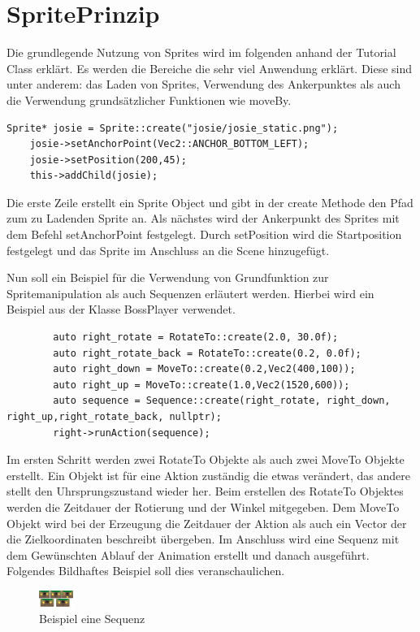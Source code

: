 \section{SpritePrinzip}
Die grundlegende Nutzung von Sprites wird im folgenden anhand der Tutorial Class erklärt. Es werden die Bereiche die sehr viel Anwendung erklärt. Diese sind unter anderem: das Laden von Sprites, Verwendung des Ankerpunktes als auch die Verwendung grundsätzlicher Funktionen wie moveBy.

\begin{lstlisting}
Sprite* josie = Sprite::create("josie/josie_static.png");
	josie->setAnchorPoint(Vec2::ANCHOR_BOTTOM_LEFT);
	josie->setPosition(200,45);
	this->addChild(josie);
\end{lstlisting}

Die erste Zeile erstellt ein Sprite Object und gibt in der create Methode den Pfad zum zu Ladenden Sprite an. Als nächstes wird der Ankerpunkt des Sprites mit dem Befehl setAnchorPoint festgelegt. Durch setPosition wird die Startposition festgelegt und das Sprite im Anschluss an die Scene hinzugefügt. 


Nun soll ein Beispiel für die Verwendung von Grundfunktion zur Spritemanipulation als auch Sequenzen erläutert werden. Hierbei wird ein Beispiel aus der Klasse BossPlayer verwendet.

\begin{lstlisting}
		auto right_rotate = RotateTo::create(2.0, 30.0f);
		auto right_rotate_back = RotateTo::create(0.2, 0.0f);
		auto right_down = MoveTo::create(0.2,Vec2(400,100));
		auto right_up = MoveTo::create(1.0,Vec2(1520,600));
		auto sequence = Sequence::create(right_rotate, right_down, right_up,right_rotate_back, nullptr);
		right->runAction(sequence);
\end{lstlisting}

Im ersten Schritt werden zwei RotateTo Objekte als auch zwei MoveTo Objekte erstellt. Ein Objekt ist für eine Aktion zuständig die etwas verändert, das andere stellt den Uhrsprungszustand wieder her. Beim erstellen des RotateTo Objektes werden die Zeitdauer der Rotierung und der Winkel mitgegeben. Dem MoveTo Objekt wird bei der Erzeugung die Zeitdauer der Aktion als auch ein Vector der die Zielkoordinaten beschreibt übergeben. Im Anschluss wird eine Sequenz mit dem Gewünschten Ablauf der Animation erstellt und danach ausgeführt. Folgendes Bildhaftes Beispiel soll dies veranschaulichen. 

\begin{figure}[H]
  \includegraphics[width=0.1\textwidth]{resources/dokubaum}
  \caption{Beispiel eine Sequenz}
  \label{fig:josie} 
\end{figure}

